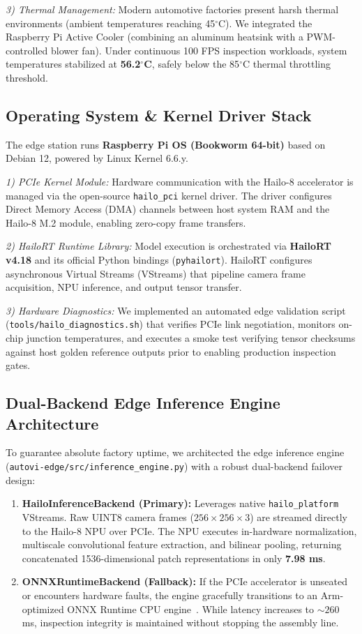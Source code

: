 \documentclass[journal,twocolumn]{IEEEtran}
\begin{document}
\textit{3) Thermal Management:} Modern automotive factories present harsh thermal environments (ambient temperatures reaching 45$^\circ$C). We integrated the Raspberry Pi Active Cooler (combining an aluminum heatsink with a PWM-controlled blower fan). Under continuous 100 FPS inspection workloads, system temperatures stabilized at \textbf{56.2$^\circ$C}, safely below the 85$^\circ$C thermal throttling threshold.

\subsection{Operating System & Kernel Driver Stack}
The edge station runs \textbf{Raspberry Pi OS (Bookworm 64-bit)} based on Debian 12, powered by Linux Kernel 6.6.y.

\textit{1) PCIe Kernel Module:} Hardware communication with the Hailo-8 accelerator is managed via the open-source \texttt{hailo\_pci} kernel driver. The driver configures Direct Memory Access (DMA) channels between host system RAM and the Hailo-8 M.2 module, enabling zero-copy frame transfers.

\textit{2) HailoRT Runtime Library:} Model execution is orchestrated via \textbf{HailoRT v4.18} and its official Python bindings (\texttt{pyhailort}). HailoRT configures asynchronous Virtual Streams (VStreams) that pipeline camera frame acquisition, NPU inference, and output tensor transfer.

\textit{3) Hardware Diagnostics:} We implemented an automated edge validation script (\texttt{tools/hailo\_diagnostics.sh}) that verifies PCIe link negotiation, monitors on-chip junction temperatures, and executes a smoke test verifying tensor checksums against host golden reference outputs prior to enabling production inspection gates.

\subsection{Dual-Backend Edge Inference Engine Architecture}
To guarantee absolute factory uptime, we architected the edge inference engine (\texttt{autovi-edge/src/inference\_engine.py}) with a robust dual-backend failover design:
\begin{enumerate}
    \item \textbf{HailoInferenceBackend (Primary):} Leverages native \texttt{hailo\_platform} VStreams. Raw UINT8 camera frames ($256 \times 256 \times 3$) are streamed directly to the Hailo-8 NPU over PCIe. The NPU executes in-hardware normalization, multiscale convolutional feature extraction, and bilinear pooling, returning concatenated 1536-dimensional patch representations in only \textbf{7.98 ms}.
    \item \textbf{ONNXRuntimeBackend (Fallback):} If the PCIe accelerator is unseated or encounters hardware faults, the engine gracefully transitions to an Arm-optimized ONNX Runtime CPU engine~\cite{onnxruntime2024}. While latency increases to $\sim 260$ ms, inspection integrity is maintained without stopping the assembly line.
\end{enumerate}
\end{document}

